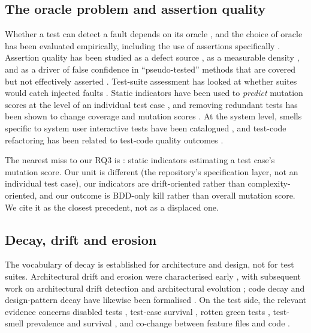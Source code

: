 \subsection{The oracle problem and assertion quality}

Whether a test can detect a fault depends on its oracle \citep{barr2015oracleproblem}, and the choice of
oracle has been evaluated empirically, including the use of assertions specifically
\citep{shrestha2011assertionsoracles}. Assertion quality has been studied as a defect source
\citep{zhi2013inadequateassertions,zhang2015assertions}, as a measurable density
\citep{Catolino2019AssertionDensity}, and as a driver of false confidence in ``pseudo-tested'' methods
that are covered but not effectively asserted \citep{veraperez2018pseudotested}. Test-suite assessment
has looked at whether suites would catch injected faults
\citep{yandrapally2021maewu,soto2021e2edataset}. Static indicators have been used to
\emph{predict} mutation scores at the level of an individual test case
\citep{Grano2021Lightweight}, and removing redundant tests has been shown to change coverage and
mutation scores \citep{Bhatta2025TestDeletion}. At the system level, smells specific to system user
interactive tests have been catalogued \citep{rwemalika2023suit}, and test-code refactoring has been
related to test-code quality outcomes \citep{Martins2024TestRefactoring}.

The nearest miss to our RQ3 is \citet{Grano2021Lightweight}: static indicators estimating a test
case's mutation score. Our unit is different (the repository's specification layer, not an individual
test case), our indicators are drift-oriented rather than complexity-oriented, and our outcome is
BDD-only kill rather than overall mutation score. We cite it as the closest precedent, not as a
displaced one.

\subsection{Decay, drift and erosion}

The vocabulary of decay is established for architecture and design, not for test suites.
Architectural drift and erosion were characterised early \citep{PerryWolf1992}, with subsequent work on
architectural drift detection \citep{Rosik2010ArchDrift} and architectural evolution
\citep{Wermelinger2011ArchEvolution}; code decay and design-pattern decay have likewise been
formalised \citep{Izurieta2012Decay}. On the test side, the relevant evidence concerns disabled tests
\citep{Kim2021Disabled}, test-case survival \citep{Feldt2014GrowOld}, rotten green tests
\citep{Delplanque2019RottenGreen,Aranega2021RottenGreen}, test-smell prevalence and survival
\citep{Bavota2015AreTestSmells,Bavota2012Distribution,kim2020testsmell,Kim2021SecretLife,
Spadini2018Relation,Spadini2020Severity,Pontillo2024ML,Panichella2022TwentyYears,
Cai2026PairedSmells,Martins2023Diffusion,Fushihara2023Trend,Moonen2008Interplay,
Athanasiou2014TestCodeQuality,Pinto2012Myths}, and co-change between feature files and code
\citep{yang2019cochanges}.

